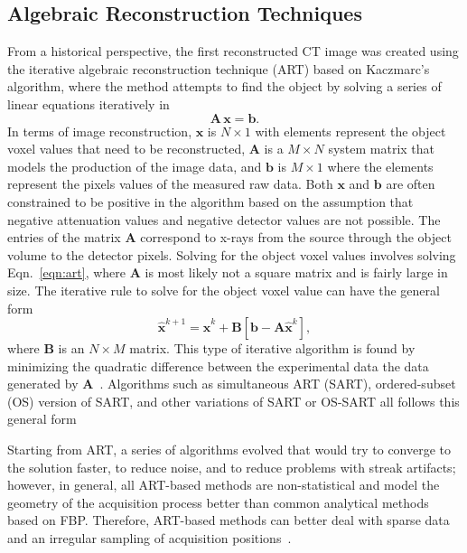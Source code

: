 \subsection{Algebraic Reconstruction Techniques}
From a historical perspective, the first reconstructed CT image was created using the iterative algebraic reconstruction technique (ART) based on Kaczmarc's algorithm, where the method attempts to find the object by solving a series of linear equations iteratively in
%
\begin{equation}
\mathbf{A}\,\mathbf{x} = \mathbf{b}.
\label{eqn:art}
\end{equation}
%
In terms of image reconstruction, $\mathbf{x}$ is $N \times 1$ with elements represent the object voxel values that need to be reconstructed, $\mathbf{A}$ is a $M \times N$ system matrix that models the production of the image data, and $\mathbf{b}$ is $M\times 1$ where the elements represent the pixels values of the measured raw data.  Both $\mathrm{\mathbf{x}}$ and $\mathrm{\mathbf{b}}$ are often constrained to be positive in the algorithm based on the assumption that negative attenuation values and negative detector values are not possible.  The entries of the matrix $\mathbf{A}$ correspond to x-rays from the source through the object volume to the detector pixels.  Solving for the object voxel values involves solving Eqn.~\ref{eqn:art}, where $\mathbf{A}$ is most likely not a square matrix and is fairly large in size.  The iterative rule to solve for the object voxel value can have the general form
%
\begin{equation}
\mathbf{\hat{x}}^{k+1} = \mathbf{\hat{x}}^{k} + \mathbf{B}[\mathbf{b} - \mathbf{A} \mathbf{\hat{x}}^k],
\end{equation}
%
where $\mathbf{B}$ is an $N \times M$ matrix.  This type of iterative algorithm is found by minimizing the quadratic difference between the  experimental data the data generated by $\mathbf{A}$~\citep{Barrett2004}.  Algorithms such as simultaneous ART (SART), ordered-subset (OS) version of SART, and other variations of SART or OS-SART all follows this general form~\citep{Yu2011, Wang2004} 

 Starting from ART, a series of algorithms evolved that would try to converge to the solution faster, to reduce noise, and to reduce problems with streak artifacts; however, in general, all ART-based methods are non-statistical and model the geometry of the acquisition process better than common analytical methods based on FBP.  Therefore, ART-based methods can better deal with sparse data and an irregular sampling of acquisition positions~\citep{Beister2012}.

